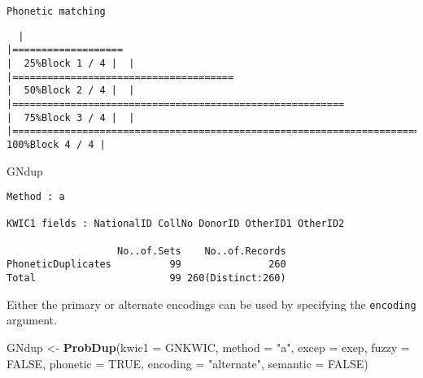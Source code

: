 \documentclass[
]{article}
\newenvironment{Shaded}{\begin{snugshade}}{\end{snugshade}}
\newcommand{\DataTypeTok}[1]{\textcolor[rgb]{0.13,0.29,0.53}{#1}}
\newcommand{\KeywordTok}[1]{\textcolor[rgb]{0.13,0.29,0.53}{\textbf{#1}}}
\newcommand{\NormalTok}[1]{#1}
\newcommand{\OtherTok}[1]{\textcolor[rgb]{0.56,0.35,0.01}{#1}}
\newcommand{\StringTok}[1]{\textcolor[rgb]{0.31,0.60,0.02}{#1}}
\begin{document}
\begin{verbatim}
Phonetic matching
\end{verbatim}

\begin{verbatim}
  |                                                                                    |===================                                                         |  25%Block 1 / 4 |  |                                                                                    |======================================                                      |  50%Block 2 / 4 |  |                                                                                    |=========================================================                   |  75%Block 3 / 4 |  |                                                                                    |============================================================================| 100%Block 4 / 4 |
\end{verbatim}

\begin{Shaded}
\begin{Highlighting}[]
\NormalTok{GNdup}
\end{Highlighting}
\end{Shaded}

\begin{verbatim}
Method : a

KWIC1 fields : NationalID CollNo DonorID OtherID1 OtherID2
 
                   No..of.Sets    No..of.Records
PhoneticDuplicates          99               260
Total                       99 260(Distinct:260)
\end{verbatim}

Either the primary or alternate encodings can be used by specifying the
\texttt{encoding} argument.

\begin{Shaded}
\begin{Highlighting}[]
\NormalTok{GNdup <-}\StringTok{ }\KeywordTok{ProbDup}\NormalTok{(}\DataTypeTok{kwic1 =}\NormalTok{ GNKWIC, }\DataTypeTok{method =} \StringTok{"a"}\NormalTok{, }\DataTypeTok{excep =}\NormalTok{ exep, }
                 \DataTypeTok{fuzzy =} \OtherTok{FALSE}\NormalTok{,}
                 \DataTypeTok{phonetic =} \OtherTok{TRUE}\NormalTok{, }\DataTypeTok{encoding =} \StringTok{"alternate"}\NormalTok{,}
                 \DataTypeTok{semantic =} \OtherTok{FALSE}\NormalTok{)}
\end{Highlighting}
\end{Shaded}
\end{document}
